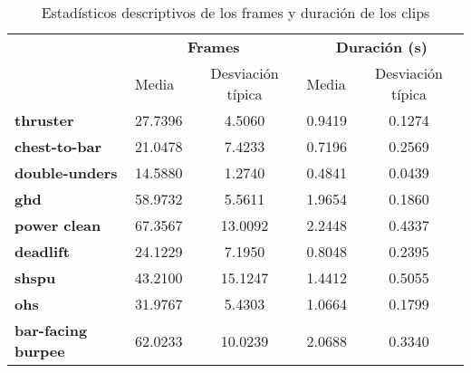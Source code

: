 \begin{table}[H]
\centering
\caption{Estadísticos descriptivos de los frames y duración de los clips}
\label{table_descriptive_stats}
\begin{tabular}{l|lc|lc}
\toprule
{} & \multicolumn{2}{c|}{\textbf{Frames}} & \multicolumn{2}{c}{\textbf{Duración (s)}} \\
{} &    Media & Desviación típica &        Media & Desviación típica \\
\midrule
\textbf{thruster}          &  27.7396 &            4.5060 &       0.9419 &            0.1274 \\
\textbf{chest-to-bar}      &  21.0478 &            7.4233 &       0.7196 &            0.2569 \\
\textbf{double-unders}     &  14.5880 &            1.2740 &       0.4841 &            0.0439 \\
\textbf{ghd}               &  58.9732 &            5.5611 &       1.9654 &            0.1860 \\
\textbf{power clean}       &  67.3567 &           13.0092 &       2.2448 &            0.4337 \\
\textbf{deadlift}          &  24.1229 &            7.1950 &       0.8048 &            0.2395 \\
\textbf{shspu}             &  43.2100 &           15.1247 &       1.4412 &            0.5055 \\
\textbf{ohs}               &  31.9767 &            5.4303 &       1.0664 &            0.1799 \\
\textbf{bar-facing burpee} &  62.0233 &           10.0239 &       2.0688 &            0.3340 \\
\bottomrule
\end{tabular}
\end{table}
